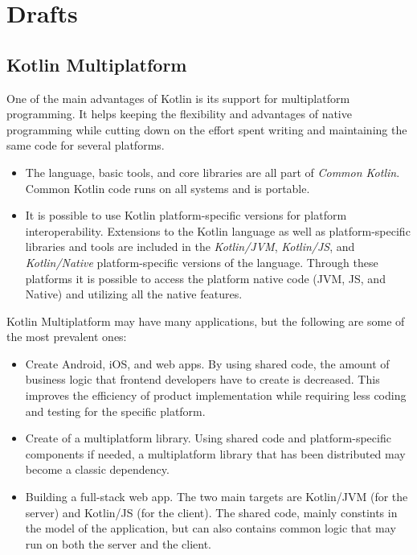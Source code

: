 \chapter{Drafts}
\section{Kotlin Multiplatform}
\label{sec:kotlin-multiplatform}
One of the main advantages of Kotlin is its support for multiplatform programming.
It helps keeping the flexibility and advantages of native programming while cutting down on
the effort spent writing and maintaining the same code for several platforms.


\begin{itemize}
	\item The language, basic tools, and core libraries are all part of \emph{Common Kotlin}. Common Kotlin code runs on all systems and is portable.
	\item It is possible to use Kotlin platform-specific versions for platform interoperability. Extensions to the Kotlin language as well as platform-specific libraries and tools are included in the \emph{Kotlin/JVM}, \emph{Kotlin/JS}, and \emph{Kotlin/Native} platform-specific versions of the language.
	Through these platforms it is possible to access the platform native code (JVM, JS, and Native) and utilizing all the native features.
\end{itemize}

Kotlin Multiplatform may have many applications, but the following are some of the most prevalent ones:

\begin{itemize}
	\item Create Android, iOS, and web apps. By using shared code, the amount of business logic that frontend developers have to create is decreased.
	This improves the efficiency of product implementation while requiring less coding and testing for the specific platform.
	\item Create of a multiplatform library.
	Using shared code and platform-specific components if needed, a multiplatform library that has been distributed may become a classic dependency.
	\item Building a full-stack web app. The two main targets are Kotlin/JVM (for the server) and Kotlin/JS (for the client). The shared code, mainly constints in the model of the application, but can also contains common logic that may run on both the server and the client.
\end{itemize}

